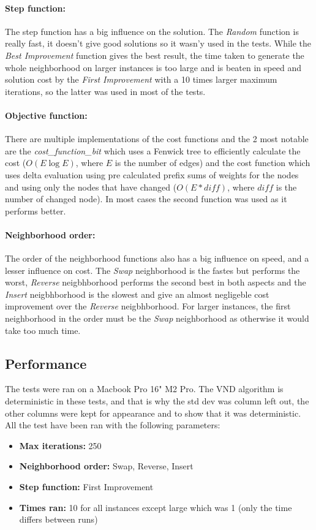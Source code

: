 \documentclass{article}
\begin{document}
\paragraph{Step function:}
The step function has a big influence on the solution. The \textit{Random} function is really fast, it doesn't give good solutions so it wasn'y used in the tests. While the \textit{Best Improvement} function gives the best result, the time taken to generate the whole neighborhood on larger instances is too large and is beaten in speed and solution cost by the \textit{First Improvement} with a 10 times larger maximum iterations, so the latter was used in most of the tests.

\paragraph{Objective function:}
There are multiple implementations of the cost functions and the 2 most notable are the \textit{cost\_function\_bit} which uses a Fenwick tree to efficiently calculate the cost ($O(E \log E)$, where $E$ is the number of edges) and the cost function which uses delta evaluation using pre calculated prefix sums of weights for the nodes and using only the nodes that have changed ($O(E*diff)$, where $diff$ is the number of changed node). In most cases the second function was used as it performs better.

\paragraph{Neighborhood order:}
The order of the neighborhood functions also has a big influence on speed, and a lesser influence on cost. The \textit{Swap} neighborhood is the fastes but performs the worst, \textit{Reverse} neigbhborhood performs the second best in both aspects and the \textit{Insert} neigbhborhood is the slowest and give an almost negligeble cost improvement over the \textit{Reverse} neigbhborhood. For larger instances, the first neighborhood in the order must be the \textit{Swap} neighborhood as otherwise it would take too much time.


\subsection*{Performance}
The tests were ran on a Macbook Pro 16" M2 Pro. The VND algorithm is deterministic in these tests, and that is why the std dev was column  left out, the other columns were kept for appearance and to show that it was deterministic. All the test have been ran with the following parameters: 
\begin{itemize}
	\item \textbf{Max iterations:} 250
	\item \textbf{Neighborhood order:} Swap, Reverse, Insert
	\item \textbf{Step function:} First Improvement
	\item \textbf{Times ran:} 10 for all instances except large which was 1 (only the time differs between runs)
\end{itemize}
\end{document}
